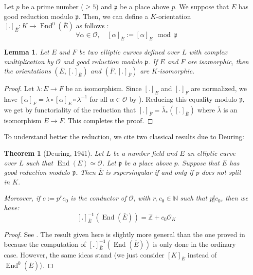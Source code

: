 \documentclass[a4paper,10pt]{report}
\theoremstyle{definition}
\theoremstyle{plain}
\newtheorem{lemma}[definition]{Lemma}
\newtheorem{theorem}[definition]{Theorem}
\theoremstyle{definition}
\newcommand{\N}{\mathbb{N}}
\newcommand{\Z}{\mathbb{Z}}
\newcommand{\mO}{\mathcal{O}}
\renewcommand{\(}{\left(}
\renewcommand{\)}{\right)}
\newcommand{\mfp}{\mathfrak{p}}
\DeclareMathOperator{\End}{End}
\begin{document}
Let $p$ be a prime number ($\geq 5$) and $\mfp$ be a place above $p$.  We suppose that $E$ has good reduction modulo $\mfp$. Then, we can define a $K$-orientation $[.]_{\overline{E}}: K\longrightarrow \End^0(\overline{E})$ as follows :
\[\forall \alpha\in \mO, \quad [\alpha]_{\overline{E}}:=[\alpha]_E \mod \mfp\]

\begin{lemma}
Let $E$ and $F$ be two elliptic curves defined over $L$ with complex multiplication by $\mO$ and good reduction modulo $\mfp$.  If $E$ and $F$ are isomorphic,  then the orientations $(\overline{E},[.]_{\overline{E}})$ and $(\overline{F},[.]_{\overline{F}})$ are $K$-isomorphic.
\end{lemma}

\begin{proof}
Let $\lambda : E\longrightarrow F$ be an isomorphism.  Since $[.]_E$ and $[.]_F$ are normalized, we have  $[\alpha]_F=\lambda\circ[\alpha]_E\circ\lambda^{-1}$ for all $\alpha\in\mO$ by \cite[corollary II.1.1.1]{Silverman2}).  Reducing this equality modulo $\mfp$, we get by functoriality of the reduction that $[.]_{\overline{F}}=\overline{\lambda}_*([.]_{\overline{E}})$ where $\overline{\lambda}$ is an isomorphism $\overline{E}\longrightarrow\overline{F}$.  This completes the proof.
\end{proof}

To understand better the reduction, we cite two classical results due to Deuring:

\begin{theorem}[Deuring, 1941]\label{theorem 1}
Let $L$ be a number field and $E$ an elliptic curve over $L$ such that $\End(E)\simeq \mO$.  Let $\mfp$ be a place above $p$. Suppose that $E$ has good reduction modulo $\mfp$.  Then $\overline{E}$ is supersingular if and only if $p$ does not split in $K$.  

Moreover,  if $c:=p^r c_0$ is the conductor of $\mO$, with $r,c_0\in\N$ such that $p\not|c_0$, then we have:
\[[.]_{\overline{E}}^{-1}(\End(\overline{E}))=\Z+c_0\mO_K\]
\end{theorem}

\begin{proof}
See \cite[chapter 13, theorem 12]{Lang_EF}.  The result given here is slightly more general than the one proved in \cite{Lang_EF} because the computation of $[.]_{\overline{E}}^{-1}(\End(\overline{E}))$ is only done in the ordinary case. However, the same ideas stand (we just consider $[K]_{\overline{E}}$ instead of $\End^0(\overline{E})$).
\end{proof}
\end{document}
